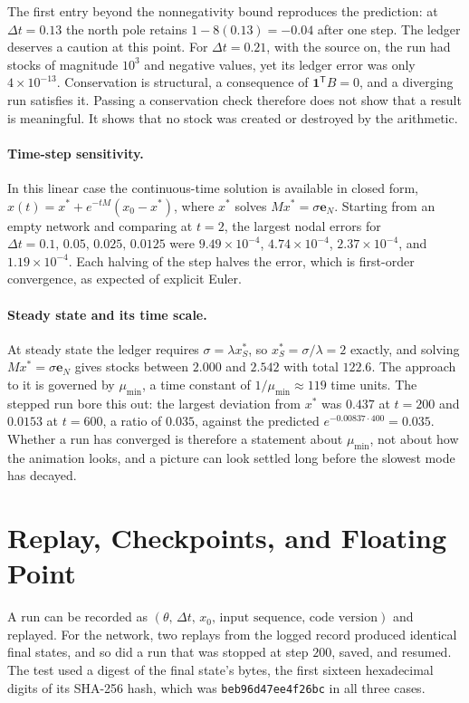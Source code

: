 The first entry beyond the nonnegativity bound reproduces the prediction: at $\Delta t=0.13$ the north pole retains $1-8(0.13)=-0.04$ after one step. The ledger deserves a caution at this point. For $\Delta t=0.21$, with the source on, the run had stocks of magnitude $10^{3}$ and negative values, yet its ledger error was only $4\times10^{-13}$. Conservation is structural, a consequence of $\mathbf 1^{\mathsf T}B=0$, and a diverging run satisfies it. Passing a conservation check therefore does not show that a result is meaningful. It shows that no stock was created or destroyed by the arithmetic.

\paragraph{Time-step sensitivity.} In this linear case the continuous-time solution is available in closed form, $x(t)=x^\ast+e^{-tM}(x_0-x^\ast)$, where $x^\ast$ solves $Mx^\ast=\sigma\mathbf e_N$. Starting from an empty network and comparing at $t=2$, the largest nodal errors for $\Delta t=0.1,\,0.05,\,0.025,\,0.0125$ were $9.49\times10^{-4}$, $4.74\times10^{-4}$, $2.37\times10^{-4}$, and $1.19\times10^{-4}$. Each halving of the step halves the error, which is first-order convergence, as expected of explicit Euler.

\paragraph{Steady state and its time scale.} At steady state the ledger requires $\sigma=\lambda x^\ast_S$, so $x^\ast_S=\sigma/\lambda=2$ exactly, and solving $Mx^\ast=\sigma\mathbf e_N$ gives stocks between $2.000$ and $2.542$ with total $122.6$. The approach to it is governed by $\mu_{\min}$, a time constant of $1/\mu_{\min}\approx119$ time units. The stepped run bore this out: the largest deviation from $x^\ast$ was $0.437$ at $t=200$ and $0.0153$ at $t=600$, a ratio of $0.035$, against the predicted $e^{-0.00837\cdot400}=0.035$. Whether a run has converged is therefore a statement about $\mu_{\min}$, not about how the animation looks, and a picture can look settled long before the slowest mode has decayed.

\section{Replay, Checkpoints, and Floating Point}

A run can be recorded as $(\theta,\,\Delta t,\,x_0,\,\text{input sequence},\,\text{code version})$ and replayed. For the network, two replays from the logged record produced identical final states, and so did a run that was stopped at step $200$, saved, and resumed. The test used a digest of the final state's bytes, the first sixteen hexadecimal digits of its SHA-256 hash, which was \texttt{beb96d47ee4f26bc} in all three cases.

